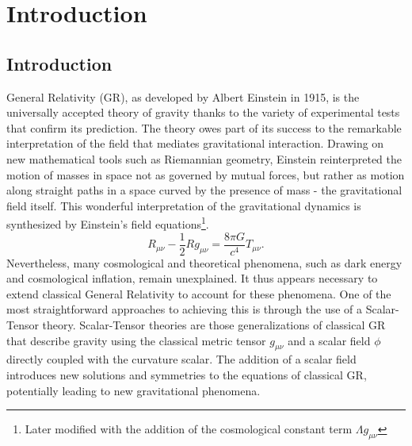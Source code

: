 


\chapter{Introduction}
\thispagestyle{empty}

\section{Introduction}
General Relativity (GR), as developed by Albert Einstein in 1915, is the universally accepted theory of gravity thanks to the variety of experimental tests that confirm its prediction. The theory owes part of its success to the remarkable interpretation of the field that mediates gravitational interaction. Drawing on new mathematical tools such as Riemannian geometry, Einstein reinterpreted the motion of masses in space not as governed by mutual forces, but rather as motion along straight paths in a space curved by the presence of mass - 
the gravitational field itself.
This wonderful interpretation of the gravitational dynamics is synthesized by Einstein's field equations\footnote{Later modified with the addition of the cosmological constant term $\Lambda g_{\mu \nu}$}.
\begin{equation}
    R_{\mu\nu}-\frac{1}{2}Rg_{\mu \nu} = \frac{8\pi G}{c^4}T_{\mu \nu}.
    \label{equazioni di campo GR}
\end{equation}
Nevertheless, many cosmological and theoretical phenomena, such as dark energy and cosmological inflation, remain unexplained. It thus appears necessary to extend classical General Relativity to account for these phenomena. One of the most straightforward approaches to achieving this is through the use of a Scalar-Tensor theory.
Scalar-Tensor theories are those generalizations of classical GR that describe gravity using the classical metric tensor $g_{\mu \nu}$ and a scalar field $\phi$ directly coupled with the curvature scalar. The addition of a scalar field introduces new solutions and symmetries to the equations of classical GR, potentially leading to new gravitational phenomena.
\vspace{0.5 pt} 

